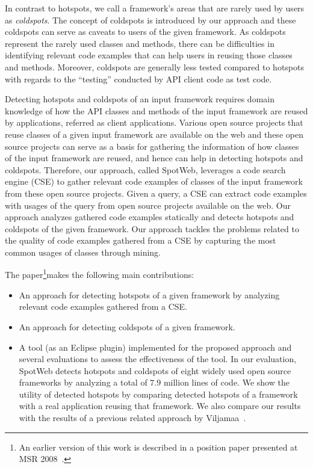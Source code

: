 \documentclass[conference]{IEEEtran}
\newcommand{\Intro}[1]{\emph{#1}}
\newcommand{\SmallSpace}{\vspace*{-1.5ex}}
\newcommand{\Item}{\SmallSpace\item}
\newenvironment{Itemize}{\begin{itemize}}{\end{itemize}\SmallSpace}
\begin{document}
In contrast to hotspots, we call a framework's areas that
are rarely used by users as \Intro{coldspots}.
The concept of coldspots is introduced by our approach and these
coldspots can serve as caveats to users of the given framework.
As coldspots represent the rarely used classes and methods, there can be difficulties
in identifying relevant code examples that can help users in reusing
those classes and methods. Moreover, coldspots are generally less tested compared to hotspots
with regards to the ``testing'' conducted by API client code as
test code.

Detecting hotspots and coldspots of an input framework requires domain knowledge of how the API classes
and methods of the input framework are reused by applications, referred as client
applications. Various open source projects that reuse classes of a given input framework
are available on the web and these open source projects
can serve as a basis for gathering the information of how classes of the
input framework are reused, and hence can help in detecting hotspots and coldspots.
Therefore, our approach, called SpotWeb, leverages a code search engine (CSE) to gather
relevant code examples of classes of the input framework from these open source
projects. Given a query, a CSE can extract code examples
with usages of the query from open source projects available on the web. Our approach analyzes
gathered code examples statically and detects hotspots and coldspots of the
given framework. Our approach tackles
the problems related to the quality of code examples gathered
from a CSE by capturing the most common usages of classes through mining.

The paper\footnote{An earlier version of this work is described in a position paper
presented at MSR 2008~\cite{thummalapenta08:spotweb}.}makes the following main contributions:
\vspace{2ex}
\begin{Itemize}

\Item An approach for detecting hotspots of a given framework by analyzing relevant
code examples gathered from a CSE.
\vspace{3ex}
\Item An approach for detecting coldspots of a given framework.
\vspace{2ex}
\Item A tool (as an Eclipse plugin) implemented for the proposed approach 
and several evaluations to assess the effectiveness of the tool. In our evaluation,
SpotWeb detects hotspots and coldspots of eight widely used open source frameworks
by analyzing a total of $7.9$ million lines of code. We show the utility of 
detected hotspots by comparing detected hotspots
of a framework with a real application reusing that framework. We also compare our
results with the results of a previous related approach by Viljamaa~\cite{viljamaa:reverse}.
\end{Itemize}
\vspace{2ex}
\end{document}
